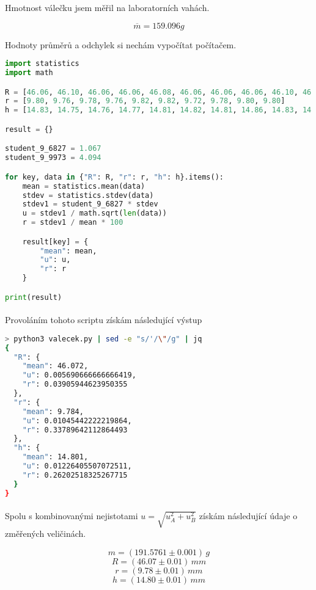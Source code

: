 \documentclass[a4paper,11pt]{article}
\begin{document}
    Hmotnost válečku jsem měřil na laboratorních vahách.

    $$\overline{m} = 159.096g$$

    Hodnoty průměrů a odchylek si nechám vypočítat počítačem.

    \begin{lstlisting}[language=Python]
import statistics
import math

R = [46.06, 46.10, 46.06, 46.06, 46.08, 46.06, 46.06, 46.06, 46.10, 46.08]
r = [9.80, 9.76, 9.78, 9.76, 9.82, 9.82, 9.72, 9.78, 9.80, 9.80]
h = [14.83, 14.75, 14.76, 14.77, 14.81, 14.82, 14.81, 14.86, 14.83, 14.77]

result = {}

student_9_6827 = 1.067
student_9_9973 = 4.094

for key, data in {"R": R, "r": r, "h": h}.items():
    mean = statistics.mean(data)
    stdev = statistics.stdev(data)
    stdev1 = student_9_6827 * stdev
    u = stdev1 / math.sqrt(len(data))
    r = stdev1 / mean * 100

    result[key] = {
        "mean": mean,
        "u": u,
        "r": r
    }

print(result)\end{lstlisting} 

    \paragraph{} Provoláním tohoto scriptu získám následující výstup

    \begin{lstlisting}[language=Bash]
> python3 valecek.py | sed -e "s/'/\"/g" | jq 
{
  "R": {
    "mean": 46.072,
    "u": 0.005690666666666419,
    "r": 0.03905944623950355
  },
  "r": {
    "mean": 9.784,
    "u": 0.01045442222219864,
    "r": 0.33789642112864493
  },
  "h": {
    "mean": 14.801,
    "u": 0.01226405507072511,
    "r": 0.26202518325267715
  }
} \end{lstlisting}

    \paragraph{} Spolu s kombinovanými nejistotami $u = \sqrt{u_{A}^{2} +
    u_{B}^{2}}$ získám následující údaje o změřených veličinách.

    $$m = (191.5761 \pm 0.001)\,g$$
    $$R = (46.07 \pm 0.01)\,mm$$
    $$r = (9.78 \pm 0.01)\,mm$$
    $$h = (14.80 \pm 0.01)\,mm$$
\end{document}
